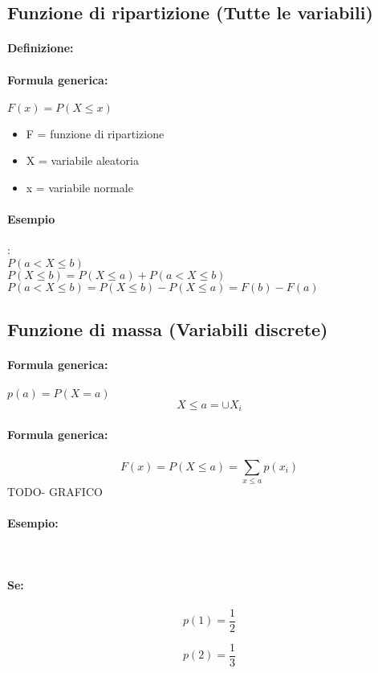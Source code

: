 \documentclass[]{article}
\newcommand{\definizione}{\paragraph{Definizione:}}
\newcommand{\formula}{\paragraph{Formula generica:}}
\begin{document}
    \subsection{Funzione di ripartizione (Tutte le variabili)}
    \definizione
    \formula $ F(x) = P(X \leq x) $
    \begin{itemize}
        \item F = funzione di ripartizione
        \item X = variabile aleatoria
        \item x = variabile normale
    \end{itemize}
    
    \paragraph{Esempio}:  \\
    \linebreak[4]
    $ P(a < X \leq b) $ \\
    \linebreak[4]
    $ P(X \leq b) = P(X \leq a) + P(a < X \leq b) $ \\
    \linebreak[4]
    $ P(a < X \leq b) = P(X \leq b) - P(X \leq a) = F(b) - F(a) $
    
  
    \subsection{Funzione di massa (Variabili discrete)}
    \formula $p(a) = P(X = a) $ \\
    \linebreak[4]
    \[ X \leq a = \cup X_i \]
    \formula \[ F(x) = P(X \leq a) = \sum_{x \leq a}^{} p(x_i) \]
    TODO- GRAFICO
    \paragraph{Esempio:}  \\
    \paragraph{Se:}
    \begin{minipage}{0.45\textwidth}
        \[ p(1) = \frac{1}{2} \]
    \end{minipage}
    \begin{minipage}{0.45\textwidth}
        \[ p(2) = \frac{1}{3} \]
    \end{minipage}
    
\end{document}
